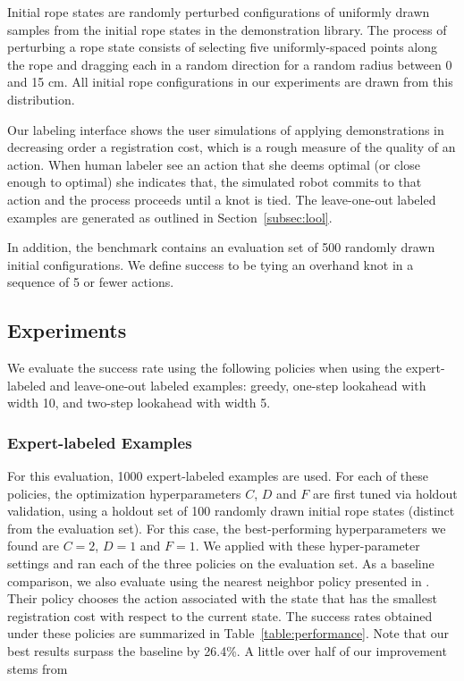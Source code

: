Initial rope states are randomly perturbed configurations of uniformly drawn samples from the initial rope states in the demonstration library.
The process of perturbing a rope state consists of selecting five uniformly-spaced points along the rope and dragging each in a random direction for a random radius between 0 and 15 cm.
All initial rope configurations in our experiments are drawn from this distribution.

Our labeling interface shows the user simulations of applying demonstrations in decreasing order a registration cost, which is a rough measure of the quality of an action.
When human labeler see an action that she deems optimal (or close enough to optimal) she indicates that, the simulated robot commits to that action and the process 
proceeds until a knot is tied.
The leave-one-out labeled examples are generated as outlined in Section~\ref{subsec:lool}. 

In addition, the benchmark contains an evaluation set of 500 randomly drawn initial configurations. 
We define success to be tying an overhand knot in a sequence of 5 or fewer actions.

\subsection{Experiments}
We evaluate the success rate using the following policies when using the expert-labeled and leave-one-out labeled examples: greedy, one-step lookahead with width 10, and two-step lookahead with width 5.
\subsubsection{Expert-labeled Examples}
For this evaluation, 1000 expert-labeled examples are used.
For each of these policies, the optimization hyperparameters $C$, $D$ and $F$ are first tuned via holdout 
validation, using a holdout set of 100 randomly drawn initial rope states (distinct from the evaluation set). 
For this case, the best-performing hyperparameters we found are $C=2$, $D=1$ and $F=1$.
We applied \mmql{} with these hyper-parameter settings and ran each of the three policies 
on the evaluation set.
As a baseline comparison, we also evaluate using the nearest neighbor policy presented in \citet{Schulmanetal_ISRR2013}.
Their policy chooses the action associated with the state that has the smallest registration cost with respect to the current state.
The success rates obtained under these policies are summarized in Table~\ref{table:performance}. Note that our best results surpass the baseline by 26.4\%.
A little over half of our improvement stems from 

